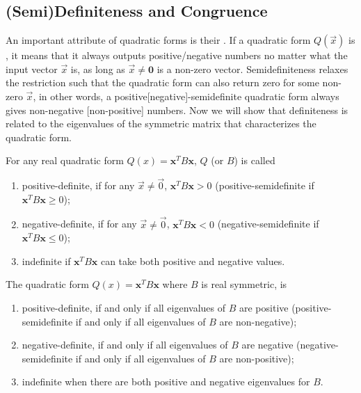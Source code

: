 \subsection{(Semi)Definiteness and Congruence}
\label{subsection:definiteness}

An important attribute of quadratic forms is their . If a quadratic form $Q(\vec{x})$ is , it means that it always outputs positive/negative numbers no matter what the input vector $\vec{x}$ is, as long as $\vec{x} \neq \textbf{0}$ is a non-zero vector. Semidefiniteness relaxes the restriction such that the quadratic form can also return zero for some non-zero $\vec{x}$, in other words, a positive[negative]-semidefinite quadratic form always gives non-negative [non-positive] numbers. Now we will show that definiteness is related to the eigenvalues of the symmetric matrix that characterizes the quadratic form.
\begin{defn}
\label{defn:quaddefinite}
For any real quadratic form $Q(x) = \textbf{x}^T B\textbf{x}$, $Q$ (or $B$) is called
\begin{enumerate}[label=(\alph*)]
\item positive-definite, if for any $\vec{x} \neq \vec{0}$, $\textbf{x}^T B\textbf{x} > 0$ (positive-semidefinite if $\textbf{x}^T B\textbf{x} \geq 0$);
\item negative-definite, if for any $\vec{x} \neq \vec{0}$, $\textbf{x}^T B\textbf{x} < 0$ (negative-semidefinite if $\textbf{x}^T B\textbf{x} \leq 0$); 
\item indefinite if $\textbf{x}^T B\textbf{x}$ can take both positive and negative values.
\end{enumerate}
\end{defn}
\begin{thm}
\label{thm:quaddefinite}
The quadratic form $Q(x) = \textbf{x}^T B\textbf{x}$ where $B$ is real symmetric, is
\begin{enumerate}[label=(\alph*)]
\item positive-definite, if and only if all eigenvalues of $B$ are positive (positive-semidefinite if and only if all eigenvalues of $B$ are non-negative);
\item negative-definite, if and only if all eigenvalues of $B$ are negative (negative-semidefinite if and only if all eigenvalues of $B$ are non-positive); 
\item indefinite when there are both positive and negative eigenvalues for $B$.
\end{enumerate}
\end{thm}
